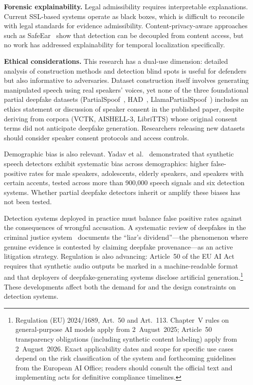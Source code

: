 \documentclass[journal]{IEEEtran}
\begin{document}
\textbf{Forensic explainability.} Legal admissibility requires interpretable explanations. Current SSL-based systems operate as black boxes, which is difficult to reconcile with legal standards for evidence admissibility. Content-privacy-aware approaches such as SafeEar~\cite{li2024safeear} show that detection can be decoupled from content access, but no work has addressed explainability for temporal localization specifically.

\textbf{Ethical considerations.} This research has a dual-use dimension: detailed analysis of construction methods and detection blind spots is useful for defenders but also informative to adversaries. Dataset construction itself involves generating manipulated speech using real speakers' voices, yet none of the three foundational partial deepfake datasets (PartialSpoof~\cite{zhang2023partialspoof}, HAD~\cite{yi2021had}, LlamaPartialSpoof~\cite{luong2025llamapartialspoof}) includes an ethics statement or discussion of speaker consent in the published paper, despite deriving from corpora (VCTK, AISHELL-3, LibriTTS) whose original consent terms did not anticipate deepfake generation. Researchers releasing new datasets should consider speaker consent protocols and access controls.

Demographic bias is also relevant. Yadav et al.~\cite{yadav2024fairssd} demonstrated that synthetic speech detectors exhibit systematic bias across demographics: higher false-positive rates for male speakers, adolescents, elderly speakers, and speakers with certain accents, tested across more than 900,000 speech signals and six detection systems. Whether partial deepfake detectors inherit or amplify these biases has not been tested.

Detection systems deployed in practice must balance false positive rates against the consequences of wrongful accusation. A systematic review of deepfakes in the criminal justice system~\cite{sandoval2024deepfakes} documents the ``liar's dividend''---the phenomenon where genuine evidence is contested by claiming deepfake provenance---as an active litigation strategy. Regulation is also advancing: Article~50 of the EU AI Act~\cite{euaiact2024} requires that synthetic audio outputs be marked in a machine-readable format and that deployers of deepfake-generating systems disclose artificial generation.\footnote{Regulation (EU) 2024/1689, Art.~50 and Art.~113. Chapter~V rules on general-purpose AI models apply from 2~August~2025; Article~50 transparency obligations (including synthetic content labeling) apply from 2~August~2026. Exact applicability dates and scope for specific use cases depend on the risk classification of the system and forthcoming guidelines from the European AI Office; readers should consult the official text and implementing acts for definitive compliance timelines.} These developments affect both the demand for and the design constraints on detection systems.
\end{document}
